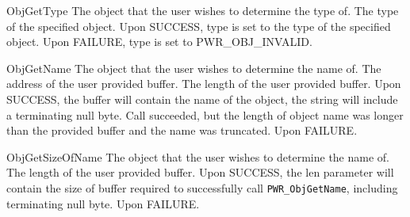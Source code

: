 \begin{prototype}{ObjGetType}
		{\pInput}	{The object that the user wishes to determine the type of.}
		{\pOutput}	{The type of the specified object.}
	 	{ Upon SUCCESS, type is set to the type of the specified object.}
	 	{ Upon FAILURE, type is set to PWR_OBJ_INVALID.}
\end{prototype}
\begin{prototype}{ObjGetName}
		{\pInput}	{The object that the user wishes to determine the name of.}
	    	{\pInput}	{The address of the user provided buffer.}
	    	{\pInput}	{The length of the user provided buffer.}
	 	{Upon SUCCESS, the buffer will contain the name of the object, the string will include a terminating null byte.}	
	 	{Call succeeded, but the length of object name was longer than the provided buffer and the name was truncated.}
	 	{Upon FAILURE.}
\end{prototype}
\begin{prototype}{ObjGetSizeOfName}
      {\pInput}   {The object that the user wishes to determine the name of.}
         {\pInputOutput} {The length of the user provided buffer.}
         {Upon SUCCESS, the len parameter will contain the size of buffer required to successfully call \texttt{PWR_ObjGetName}, including terminating null byte.}
         {Upon FAILURE.}
\end{prototype}

